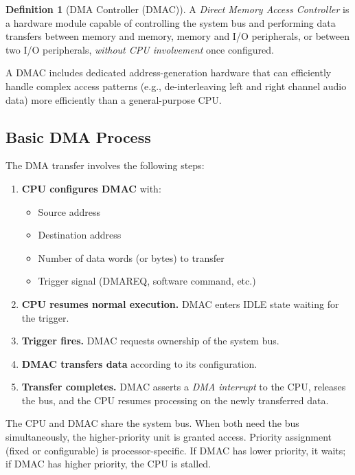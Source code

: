 \documentclass[11pt, a4paper, notitlepage]{report}
\theoremstyle{definition}
\newtheorem{definition}[theorem]{Definition}
\theoremstyle{remark}
\theoremstyle{definition}
\begin{document}
\begin{definition}[DMA Controller (DMAC)]
  \label{def:dmac}
  A \emph{Direct Memory Access Controller} is a hardware module capable of controlling the system bus and performing data transfers between memory and memory, memory and I/O peripherals, or between two I/O peripherals, \emph{without CPU involvement} once configured.
\end{definition}

A DMAC includes dedicated address-generation hardware that can efficiently handle complex access patterns (e.g., de-interleaving left and right channel audio data) more efficiently than a general-purpose CPU.

\subsection{Basic DMA Process}
\label{sec:dma-process}

The DMA transfer involves the following steps:

\begin{enumerate}
  \item \textbf{CPU configures DMAC} with:
    \begin{itemize}
      \item Source address
      \item Destination address
      \item Number of data words (or bytes) to transfer
      \item Trigger signal (DMAREQ, software command, etc.)
    \end{itemize}
  \item \textbf{CPU resumes normal execution.} DMAC enters IDLE state waiting for the trigger.
  \item \textbf{Trigger fires.} DMAC requests ownership of the system bus.
  \item \textbf{DMAC transfers data} according to its configuration.
  \item \textbf{Transfer completes.} DMAC asserts a \emph{DMA interrupt} to the CPU, releases the bus, and the CPU resumes processing on the newly transferred data.
\end{enumerate}

\begin{keyresult}[title={Key Result: DMA Bus Arbitration}]
  The CPU and DMAC share the system bus. When both need the bus simultaneously, the higher-priority unit is granted access. Priority assignment (fixed or configurable) is processor-specific. If DMAC has lower priority, it waits; if DMAC has higher priority, the CPU is stalled.
\end{keyresult}
\end{document}
